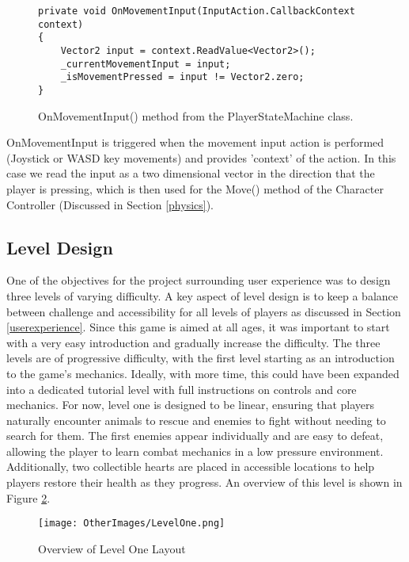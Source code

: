 \documentclass[10pt]{final_report}
\begin{document}
\begin{figure}[H]
\begin{verbatim}
private void OnMovementInput(InputAction.CallbackContext context)
{
    Vector2 input = context.ReadValue<Vector2>();
    _currentMovementInput = input;
    _isMovementPressed = input != Vector2.zero;
}
\end{verbatim}
\caption{OnMovementInput() method from the PlayerStateMachine class.}
\label{onmovementinput}
\end{figure}
OnMovementInput is triggered when the movement input action is performed (Joystick or WASD key movements) and provides 'context' of the action. In this case we read the input as a two dimensional vector in the direction that the player is pressing, which is then used for the Move() method of the Character Controller (Discussed in Section \ref{physics}). 

\subsection{Level Design}\label{leveldesign}
One of the objectives for the project surrounding user experience was to design three levels of varying difficulty. A key aspect of level design is to keep a balance between challenge and accessibility for all levels of players as discussed in Section \ref{userexperience}. Since this game is aimed at all ages, it was important to start with a very easy introduction and gradually increase the difficulty. The three levels are of progressive difficulty, with the first level starting as an introduction to the game’s mechanics. Ideally, with more time, this could have been expanded into a dedicated tutorial level with full instructions on controls and core mechanics. For now, level one is designed to be linear, ensuring that players naturally encounter animals to rescue and enemies to fight without needing to search for them. The first enemies appear individually and are easy to defeat, allowing the player to learn combat mechanics in a low pressure environment. Additionally, two collectible hearts are placed in accessible locations to help players restore their health as they progress. An overview of this level is shown in Figure \ref{fig:label_LevelOne}.

\begin{figure}[H]
    \centering
    \texttt{[image: OtherImages/LevelOne.png]}
    \caption{Overview of Level One Layout}
    \label{fig:label_LevelOne}
\end{figure}
\end{document}

